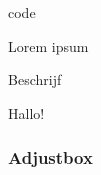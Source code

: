 \begin{saveblock}{code}
    \begin{highlightblock}[linewidth=0.65\textwidth,gobble=8]

        Lorem ipsum
    
        Beschrijf \textellipsis
    
        {Hallo!}%
    \end{highlightblock}
\end{saveblock}

\begin{frame}
    \frametitle{Adjustbox}

    \begin{columns}
        \begin{column}{0.65\textwidth}
        \end{column}
        \begin{column}{0.35\textwidth}
        \end{column}
    \end{columns}
\end{frame}
